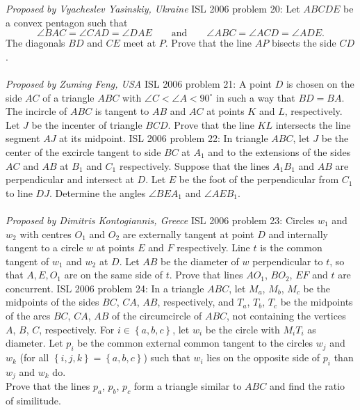 \textit{Proposed by Vyacheslev Yasinskiy, Ukraine} 
ISL 2006 problem 20:  Let $ ABCDE$ be a convex pentagon such that
\[
\angle BAC = \angle CAD = \angle DAE\qquad \text{and}\qquad \angle ABC = \angle ACD = \angle ADE.
\]
The diagonals $BD$ and $CE$ meet at $P$.  Prove that the line $AP$ bisects the side $CD$. \\\\
\textit{Proposed by Zuming Feng, USA} 
ISL 2006 problem 21:  A point $D$ is chosen on the side $AC$ of a triangle $ABC$ with $\angle C < \angle A < 90^\circ$ in such a way that $BD=BA$.  The incircle of $ABC$ is tangent to $AB$ and $AC$ at points $K$ and $L$, respectively.  Let $J$ be the incenter of triangle $BCD$.  Prove that the line $KL$ intersects the line segment $AJ$ at its midpoint. 
ISL 2006 problem 22:  In triangle $ABC$, let $J$ be the center of the excircle tangent to side $BC$ at $A_1$ and to the extensions of the sides $AC$ and $AB$ at $B_1$ and $C_1$ respectively. Suppose that the lines $A_1B_1$ and $AB$ are perpendicular and intersect at $D$. Let $E$ be the foot of the perpendicular from $C_1$ to line $DJ$. Determine the angles $\angle{BEA_1}$ and $\angle{AEB_1}$. \\\\
\textit{Proposed by Dimitris Kontogiannis, Greece} 
ISL 2006 problem 23:  Circles $ w_1$ and $ w_2$ with centres $ O_1$ and $ O_2$ are externally tangent at point $ D$ and internally tangent to a circle $ w$ at points $ E$ and $ F$ respectively. Line $ t$ is the common tangent of $ w_1$ and $ w_2$ at $ D$. Let $ AB$ be the diameter of $ w$ perpendicular to $ t$, so that $ A, E, O_1$ are on the same side of $ t$. Prove that lines $ AO_1$, $ BO_2$, $ EF$ and $ t$ are concurrent. 
ISL 2006 problem 24:  In a triangle $ ABC$, let $ M_a$, $ M_b$, $ M_c$ be the midpoints of the sides $ BC$, $ CA$, $ AB$, respectively, and $ T_a$, $ T_b$, $ T_c$ be the midpoints of the arcs $ BC$, $ CA$, $ AB$ of the circumcircle of $ ABC$, not containing the vertices $ A$, $ B$, $ C$, respectively. For $ i \in \left\{a, b, c\right\}$, let $ w_i$ be the circle with $ M_iT_i$ as diameter. Let $ p_i$ be the common external common tangent to the circles $ w_j$ and $ w_k$ (for all $ \left\{i, j, k\right\}= \left\{a, b, c\right\}$) such that $ w_i$ lies on the opposite side of $ p_i$ than $ w_j$ and $ w_k$ do. \\
Prove that the lines $ p_a$, $ p_b$, $ p_c$ form a triangle similar to $ ABC$ and find the ratio of similitude. \\\\
